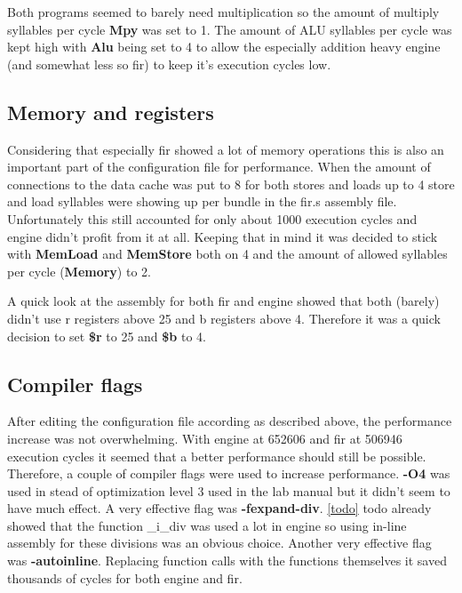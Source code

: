 Both programs seemed to barely need multiplication so the amount of multiply syllables per cycle \textbf{Mpy} was set to 1. The amount of ALU syllables per cycle was kept high with \textbf{Alu} being set to 4 to allow the especially addition heavy engine (and somewhat less so fir) to keep it's execution cycles low.

\subsection{Memory and registers}
Considering that especially fir showed a lot of memory operations this is also an important part of the configuration file for performance. When the amount of connections to the data cache was put to 8 for both stores and loads up to 4 store and load syllables were showing up per bundle in the fir.s assembly file. Unfortunately this still accounted for only about 1000 execution cycles and engine didn't profit from it at all. Keeping that in mind it was decided to stick with \textbf{MemLoad} and \textbf{MemStore} both on 4 and the amount of allowed syllables per cycle (\textbf{Memory}) to 2.

A quick look at the assembly for both fir and engine showed that both (barely) didn't use r registers above 25 and b registers above 4. Therefore it was a quick decision to set \textbf{\$r} to 25 and \textbf{\$b} to 4.

\subsection{Compiler flags}
After editing the configuration file according as described above, the performance increase was not overwhelming. With engine at 652606 and fir at 506946 execution cycles it seemed that a better performance should still be possible. Therefore, a couple of compiler flags were used to increase performance. \textbf{-O4} was used in stead of optimization level 3 used in the lab manual but it didn't seem to have much effect. A very effective flag was \textbf{-fexpand-div}. \cref{todo} todo already showed that the function \_i\_div was used a lot in engine so using in-line assembly for these divisions was an obvious choice. Another very effective flag was \textbf{-autoinline}. Replacing function calls with the functions themselves it saved thousands of cycles for both engine and fir.

